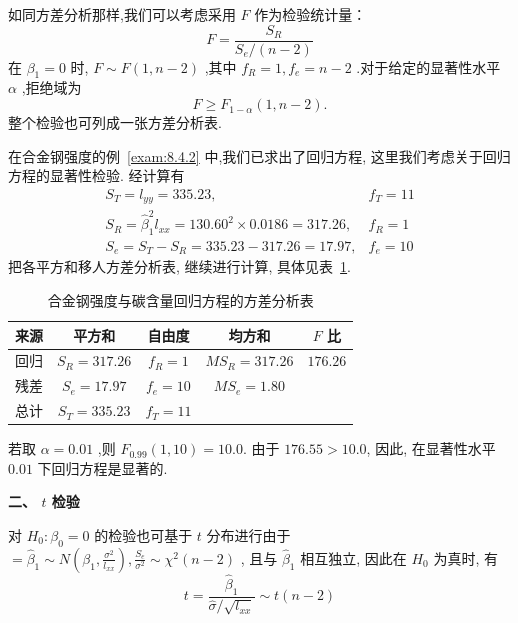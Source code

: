 如同方差分析那样,我们可以考虑采用 $F$ 作为检验统计量：
\begin{equation*}
F=\frac{S_{R}}{S_{e} /(n-2)}
\end{equation*}
在 $\beta_1=0$ 时, $F\sim F(1,n-2)$ ,其中 $f_R=1,f_e=n-2$ .对于给定的显著性水平 $\alpha$ ,拒绝域为
\begin{equation*} F\ge F_{1-\alpha}(1,n-2).  \end{equation*}
整个检验也可列成一张方差分析表.
\begin{example}\label{exam:8.4.3}
在合金钢强度的例~\ref{exam:8.4.2} 中,我们已求出了回归方程, 这里我们考虑关于回归方程的显著性检验. 经计算有
\begin{equation*}
\begin{array}{ll}
{S_{T}=l_{y y}=335.23,} & {f_{T}=11} \\ 
{S_{R}=\hat{\beta}_{1}^{2} l_{x x}=130.60^{2} \times 0.0186=317.26,} & {f_{R}=1} \\ {S_{e}=S_{T}-S_{R}=335.23-317.26=17.97,} & {f_{e}=10}
\end{array}
\end{equation*}
把各平方和移人方差分析表, 继续进行计算, 具体见表~\ref{tab:8.4.3}.
\begin{table}[htbp]
  \centering
  \caption{合金钢强度与碳含量回归方程的方差分析表}
  \begin{tabular}{ccccc}
      \toprule
      来源    &  平方和  & 自由度   & 均方和   & $ F$ 比 \\\midrule %
      回归    &  $S_R=317.26$  & $ f_R=1$   &  $MS_R=317.26$  &  $176.26$  \\
      残差    &  $S_e=17.97$  &  $f_e=10$  &  $MS_e=1.80$  &  \\\midrule
      总计    &  $S_T=335.23$  &  $f_T=11$  &       &  \\\bottomrule
  \end{tabular}%
  \label{tab:8.4.3}%
\end{table}%
若取 $\alpha=0.01$ ,则 $F_{0.99}(1,10)=10.0$. 由于 $176.55>10.0$, 因此, 在显著性水平 $0.01$ 下回归方程是显著的.
\end{example}

\textbf{二、 $t$ 检验} 

对 $H_0: \beta_0=0$ 的检验也可基于 $t$ 分布进行由于 $=\hat{\beta}_{1} \sim N \left(\beta_{1}, \frac{\sigma^{2}}{l_{x x}}\right), \frac{S_{e}}{\sigma^{2}} \sim \chi^{2}(n-2)$ , 且与 $\hat{\beta}_1$ 相互独立, 因此在 $H_0$ 为真时, 有
\begin{equation}\label{eq:8.4.17}
t=\frac{\hat{\beta}_{1}}{\hat{\sigma} / \sqrt{l_{x x}}} \sim t(n-2) 
\end{equation}

